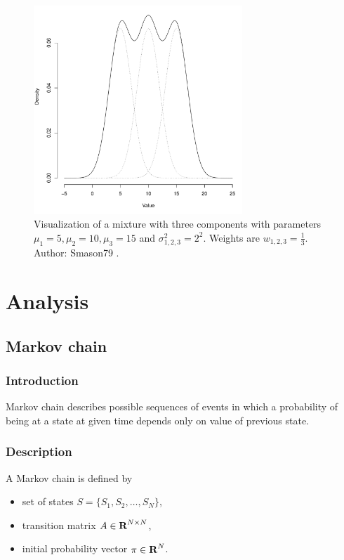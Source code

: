 \documentclass[thesis=B,english]{FITthesis}[2012/06/26]
\begin{document}
\begin{figure}
	\centering
 	\includegraphics[width=0.7\textwidth]{gaussian_mixture}
 	\caption{Visualization of a mixture with three components with parameters $\mu_1=5, \mu_2=10, \mu_3=15$ and $\sigma_{1,2,3}^2=2^2$. Weights are $w_{1,2,3} = \frac{1}{3}$. Author: Smason79 \cite{gaussian-mixture}.}
 	\label{fig:gaussian_mixture}
\end{figure}

\chapter{Analysis}

\section{Markov chain}

\subsection{Introduction}
Markov chain describes possible sequences of events in which a probability of being at a state at given time depends only on value of previous state. 

\subsection{Description}

A Markov chain is defined by

\begin{itemize}
\item set of states $S = \{S_1, S_2, \dots, S_N\}$,
\item transition matrix $A \in \textbf R^{N \times N}$,
\item initial probability vector $\pi \in \textbf R^N$.
\end{itemize}
\end{document}
